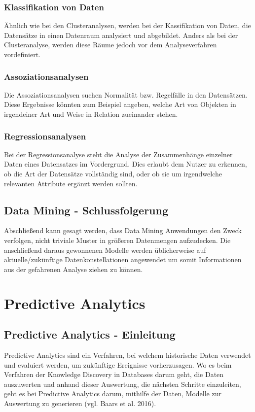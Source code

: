 \documentclass[12pt,twocolumn,twoside]{conference}   %
\begin{document}
\subsubsection{Klassifikation von Daten}
Ähnlich wie bei den Clusteranalysen, werden bei der Kassifikation von Daten, die Datensätze in einen Datenraum analysiert und abgebildet. Anders als bei der Clusteranalyse, werden diese Räume jedoch vor dem Analyseverfahren vordefiniert. 

\subsubsection{Assoziationsanalysen}
Die Assoziationsanalysen suchen Normalität bzw. Regelfälle in den Datensätzen. Diese Ergebnisse könnten zum Beispiel angeben, welche Art von Objekten in irgendeiner Art und Weise in Relation zueinander stehen. 

\subsubsection{Regressionsanalysen}
Bei der Regressionsanalyse steht die Analyse der Zusammenhänge einzelner Daten eines Datensatzes im Vordergrund. Dies erlaubt dem Nutzer zu erkennen, ob die Art der Datensätze vollständig sind, oder ob sie um  irgendwelche relevanten Attribute ergänzt werden sollten.

\subsection{Data Mining - Schlussfolgerung}
Abschließend kann gesagt werden, dass Data Mining Anwendungen den Zweck verfolgen, nicht triviale Muster in größeren Datenmengen aufzudecken. Die anschließend daraus gewonnenen Modelle werden üblicherweise auf aktuelle/zukünftige Datenkonstellationen angewendet um somit Informationen aus der gefahrenen Analyse ziehen zu können.

\section{Predictive Analytics}
\subsection{Predictive Analytics - Einleitung}
Predictive Analytics sind ein Verfahren, bei welchem historische Daten verwendet und evaluiert werden, um zukünftige Ereignisse vorherzusagen. Wo es beim Verfahren der Knowledge Discovery in Databases darum geht, die Daten auszuwerten und anhand dieser Auswertung, die nächsten Schritte einzuleiten, geht es bei Predictive Analytics darum, mithilfe der Daten, Modelle zur Auswertung zu generieren (vgl. Baars et al. 2016). 
\end{document}
